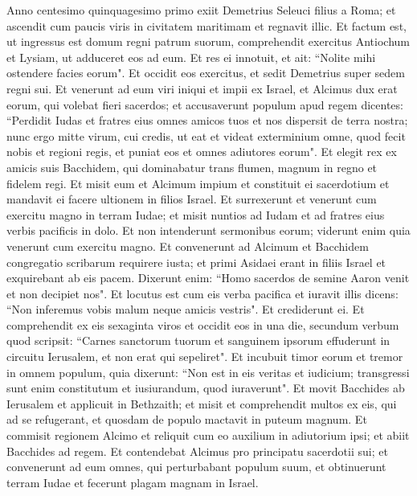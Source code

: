 \begin{biblechapter}  
\verse Anno centesimo quinquagesimo primo exiit Demetrius Seleuci filius a Roma; et ascendit cum paucis viris in civitatem maritimam et regnavit illic. 
\verse Et factum est, ut ingressus est domum regni patrum suorum, comprehendit exercitus Antiochum et Lysiam, ut adduceret eos ad eum. 
\verse Et res ei innotuit, et ait: “Nolite mihi ostendere facies eorum". 
\verse Et occidit eos exercitus, et sedit Demetrius super sedem regni sui. 
\verse Et venerunt ad eum viri iniqui et impii ex Israel, et Alcimus dux erat eorum, qui volebat fieri sacerdos; 
\verse et accusaverunt populum apud regem dicentes: “Perdidit Iudas et fratres eius omnes amicos tuos et nos dispersit de terra nostra; 
\verse nunc ergo mitte virum, cui credis, ut eat et videat exterminium omne, quod fecit nobis et regioni regis, et puniat eos et omnes adiutores eorum". 
\verse Et elegit rex ex amicis suis Bacchidem, qui dominabatur trans flumen, magnum in regno et fidelem regi. Et misit eum 
\verse et Alcimum impium et constituit ei sacerdotium et mandavit ei facere ultionem in filios Israel. 
\verse Et surrexerunt et venerunt cum exercitu magno in terram Iudae; et misit nuntios ad Iudam et ad fratres eius verbis pacificis in dolo. 
\verse Et non intenderunt sermonibus eorum; viderunt enim quia venerunt cum exercitu magno. 
\verse Et convenerunt ad Alcimum et Bacchidem congregatio scribarum requirere iusta;  
\verse et primi Asidaei erant in filiis Israel et exquirebant ab eis pacem. 
\verse Dixerunt enim: “Homo sacerdos de semine Aaron venit et non decipiet nos".  
\verse Et locutus est cum eis verba pacifica et iuravit illis dicens: “Non inferemus vobis malum neque amicis vestris". 
\verse Et crediderunt ei. Et comprehendit ex eis sexaginta viros et occidit eos in una die, secundum verbum quod scripsit: 
\verse “Carnes sanctorum tuorum et sanguinem ipsorum effuderunt in circuitu Ierusalem, et non erat qui sepeliret". 
\verse Et incubuit timor eorum et tremor in omnem populum, quia dixerunt: “Non est in eis veritas et iudicium; transgressi sunt enim constitutum et iusiurandum, quod iuraverunt". 
\verse Et movit Bacchides ab Ierusalem et applicuit in Bethzaith; et misit et comprehendit multos ex eis, qui ad se refugerant, et quosdam de populo mactavit in puteum magnum. 
\verse Et commisit regionem Alcimo et reliquit cum eo auxilium in adiutorium ipsi; et abiit Bacchides ad regem. 
\verse Et contendebat Alcimus pro principatu sacerdotii sui; 
\verse et convenerunt ad eum omnes, qui perturbabant populum suum, et obtinuerunt terram Iudae et fecerunt plagam magnam in Israel. 

\end{biblechapter}
